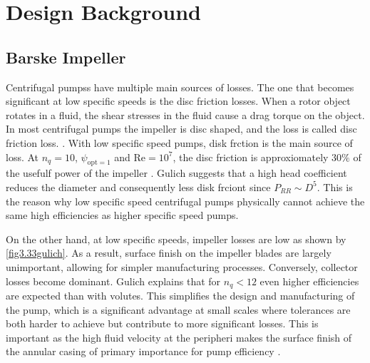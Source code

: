 \section{Design Background}

\subsection{Barske Impeller}


Centrifugal pumpss have multiple main sources of losses. The one that becomes significant at low specific speeds is the disc friction losses. When a rotor object rotates in a fluid, the shear stresses in the fluid cause a drag torque on the object. In most centrifugal pumps the impeller is disc shaped, and the loss is called disc friction loss. . With low specific speed pumps, disk frction is the main source of loss. At $n_q=10$, $\psi_{\textrm{opt}=1}$ and $\mathrm{Re}=10^7$, the disc friction is approxiomately $30\%$ of the usefulf power of the impeller \cite{gulich page 103}. Gulich suggests that a high head coefficient  reduces the diameter and consequently less disk frciont since $P_{RR}\sim D^5$. This is the reason why low specific speed centrifugal pumps physically cannot achieve the same high efficiencies as higher specific speed pumps. 

On the other hand, at low specific speeds, impeller losses are low as shown by \cref{fig3.33gulich}.  As a result, surface finish on the impeller blades are largely unimportant, allowing for simpler manufacturing processes. Conversely, collector losses become dominant.  Gulich explains \cite{gulich 7.12} that for $n_q<12$ even higher efficiencies are expected than with volutes. This simplifies the design and manufacturing of the pump, which is a significant advantage at small scales where tolerances are both harder to achieve but contribute to more significant losses.  This is important as the high fluid velocity at the peripheri makes the surface finish of the annular casing of primary importance for pump efficiency \cite{lock design features}.

